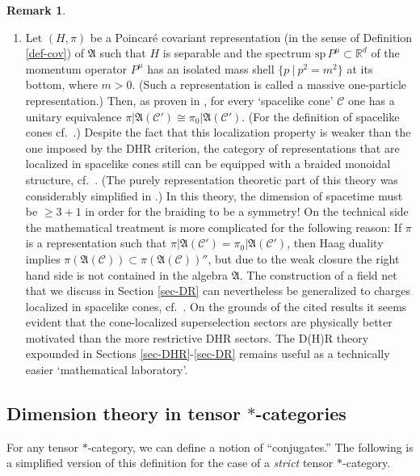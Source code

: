 \documentclass[11pt]{article}
\newcommand{\alg}[1]{\mathfrak{#1}}
\theoremstyle{definition}
\theoremstyle{definition}
\newtheorem{note}[thm]{Remark}
\theoremstyle{remark}
\def\2#1{{\mathcal #1}}
\def\7#1{{\mathbb #1}}
\begin{document}
\begin{note}
\begin{enumerate}
\item Let $(H,\pi)$ be a Poincar\'e covariant representation (in the
sense of Definition \ref{def-cov}) of $\alg{A}$ such that $H$ is
separable and the spectrum $\mathrm{sp}\,P^\mu\subset\7R^d$ of the
momentum operator $P^\mu$ has an isolated mass shell $\{p \ | \
p^2=m^2\}$ at its bottom, where $m>0$. (Such a representation is
called a massive one-particle representation.) Then, as proven in
\cite{buch-fred}, for every `spacelike cone' $\2C$ one has a unitary
equivalence $\pi|\alg{A}(\2C')\cong\pi_0|\alg{A}(\2C')$. (For the
definition of spacelike cones cf.\ \cite{buch-fred}.) Despite the fact
that this localization property is weaker than the one imposed by the
DHR criterion, the category of representations that are localized in
spacelike cones still can be equipped with a braided monoidal
structure, cf.\ \cite{buch-fred}. (The purely representation theoretic
part of this theory was considerably simplified in \cite[Section
4]{dr2}.) In this theory, the dimension of spacetime must be $\ge 3+1$
in order for the braiding to be a symmetry! On the technical side the
mathematical treatment is more complicated for the following reason:
If $\pi$ is a representation such that
$\pi|\alg{A}(\2C')=\pi_0|\alg{A}(\2C')$, then Haag duality implies
$\pi(\alg{A}(\2C))\subset\pi(\alg{A}(\2C))''$, but due to the weak
closure the right hand side is not contained in the algebra $\alg{A}$.
The construction of a field net that we discuss in Section
\ref{sec-DR} can nevertheless be generalized to charges localized in
spacelike cones, cf.\ \cite[Section 5]{dr2}. On the grounds of the
cited results it seems evident that the cone-localized superselection
sectors are physically better motivated than the more restrictive DHR
sectors. The D(H)R theory expounded in Sections
\ref{sec-DHR}-\ref{sec-DR} remains useful as a technically easier
`mathematical laboratory'.
\end{enumerate}
\end{note}


\subsection{Dimension theory in tensor
  $*$-categories} \label{dimension}

For any tensor $*$-category, we can define a notion of
``conjugates.''  The following is a simplified version
of this definition for the case of a \emph{strict}
tensor $*$-category.  
\end{document}
